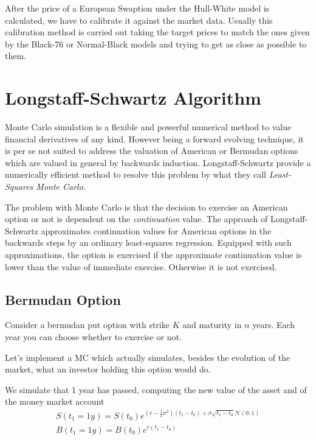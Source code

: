 \documentclass[12pt,a4paper]{article}
\begin{document}
After the price of a European Swaption under the Hull-White model is calculated, we have to calibrate it against the market data. Usually this calibration method is carried out taking the target prices to match the ones given by the Black-76 or Normal-Black models and trying to get as close as possible to them.

\clearpage
\section{Longstaff-Schwartz Algorithm}

Monte Carlo simulation is a flexible and powerful numerical method to value financial derivatives of any kind. However being a forward evolving technique, it is per se not suited to address the valuation of American or Bermudan options which are valued in general by backwards induction. Longstaff-Schwartz provide a numerically efficient method to resolve this problem by what they call \emph{Least-Squares Monte Carlo}.

The problem with Monte Carlo is that the decision to exercise an American option or not is dependent on the \emph{continuation} value. %
The approach of Longstaff-Schwartz approximates continuation values for American options in the backwards steps by an ordinary least-squares regression.
Equipped with such approximations, the option is exercised if the approximate continuation value is lower than the value of immediate exercise. Otherwise it is not exercised.

\subsection{Bermudan Option}
Consider a bermudan put option with strike $K$ and maturity in $n$ years. Each year you can choose whether to exercise or not.

Let's implement a MC which actually simulates, besides the evolution of the market, what an investor holding this option would do. 

We simulate that 1 year has passed, computing the new value of the asset and of the money market account
\begin{equation}
	\begin{gathered}
		S(t_1=1y) = S(t_0)e^{(r-\frac{1}{2}\sigma^2)(t_1-t_0)+\sigma\sqrt{t_1-t_0}\mathcal{N}(0,1)} \\
		B(t_1=1y)=B(t_0)e^{r(t_1-t_0)}
	\end{gathered}
\end{equation}
\end{document}
